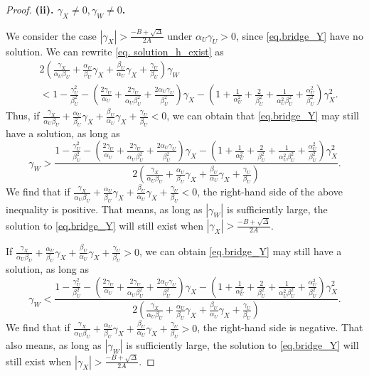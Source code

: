 \documentclass[
  12pt]{article}
\begin{document}
\begin{proof}
\textbf{(ii). $\gamma_X\ne0,\gamma_W\ne0$.} 

We consider the case $|\gamma_X|>\frac{-B+\sqrt{\Delta}}{2A}$ under $\alpha_U\gamma_U>0$, since  \eqref{eq.bridge_Y} have no solution. We can rewrite  \eqref{eq. solution_h_exist} as
\begin{align*}
    & 2\left( \frac{\gamma_X}{\alpha_U\beta_U}+\frac{\alpha_U}{\beta_U}\gamma_X+\frac{\beta_U}{\alpha_U}\gamma_X+\frac{\gamma_U}{\beta_U} \right) \gamma_W \\
    & <1-\frac{\gamma_{U}^{2}}{\beta_{U}^{2}}-\left( \frac{2\gamma_U}{\alpha_U}+\frac{2\gamma_U}{\alpha_U\beta_{U}^{2}}+\frac{2\alpha_U\gamma_U}{\beta_{U}^{2}} \right) \gamma_X-\left( 1+\frac{1}{\alpha_{U}^{2}}+\frac{2}{\beta_{U}^{2}}+\frac{1}{\alpha_{U}^{2}\beta_{U}^{2}}+\frac{\alpha_{U}^{2}}{\beta_{U}^{2}} \right) \gamma_{X}^{2}.
\end{align*}
Thus, if $\frac{\gamma_X}{\alpha_U\beta_U}+\frac{\alpha_U}{\beta_U}\gamma_X+\frac{\beta_U}{\alpha_U}\gamma_X+\frac{\gamma_U}{\beta_U}<0$, we can obtain that \eqref{eq.bridge_Y} may still have a solution, as long as
$$
\gamma_W>\frac{1-\frac{\gamma_{U}^{2}}{\beta_{U}^{2}}-\left( \frac{2\gamma_U}{\alpha_U}+\frac{2\gamma_U}{\alpha_U\beta_{U}^{2}}+\frac{2\alpha_U\gamma_U}{\beta_{U}^{2}} \right) \gamma_X-\left( 1+\frac{1}{\alpha_{U}^{2}}+\frac{2}{\beta_{U}^{2}}+\frac{1}{\alpha_{U}^{2}\beta_{U}^{2}}+\frac{\alpha_{U}^{2}}{\beta_{U}^{2}} \right) \gamma_{X}^{2}}{2\left( \frac{\gamma_X}{\alpha_U\beta_U}+\frac{\alpha_U}{\beta_U}\gamma_X+\frac{\beta_U}{\alpha_U}\gamma_X+\frac{\gamma_U}{\beta_U} \right)}.
$$
We find that if $\frac{\gamma_X}{\alpha_U\beta_U}+\frac{\alpha_U}{\beta_U}\gamma_X+\frac{\beta_U}{\alpha_U}\gamma_X+\frac{\gamma_U}{\beta_U}<0$, the right-hand side of the above inequality is positive. That means, as long as $|\gamma_W|$ is sufficiently large, the solution to  \eqref{eq.bridge_Y} will still exist when $|\gamma_X|>\frac{-B+\sqrt{\Delta}}{2A}$.


If $\frac{\gamma_X}{\alpha_U\beta_U}+\frac{\alpha_U}{\beta_U}\gamma_X+\frac{\beta_U}{\alpha_U}\gamma_X+\frac{\gamma_U}{\beta_U}>0$, we can obtain \eqref{eq.bridge_Y} may still have a solution, as long as
$$
\gamma_W<\frac{1-\frac{\gamma_{U}^{2}}{\beta_{U}^{2}}-\left( \frac{2\gamma_U}{\alpha_U}+\frac{2\gamma_U}{\alpha_U\beta_{U}^{2}}+\frac{2\alpha_U\gamma_U}{\beta_{U}^{2}} \right) \gamma_X-\left( 1+\frac{1}{\alpha_{U}^{2}}+\frac{2}{\beta_{U}^{2}}+\frac{1}{\alpha_{U}^{2}\beta_{U}^{2}}+\frac{\alpha_{U}^{2}}{\beta_{U}^{2}} \right) \gamma_{X}^{2}}{2\left( \frac{\gamma_X}{\alpha_U\beta_U}+\frac{\alpha_U}{\beta_U}\gamma_X+\frac{\beta_U}{\alpha_U}\gamma_X+\frac{\gamma_U}{\beta_U} \right)}.
$$
We find that if $\frac{\gamma_X}{\alpha_U\beta_U}+\frac{\alpha_U}{\beta_U}\gamma_X+\frac{\beta_U}{\alpha_U}\gamma_X+\frac{\gamma_U}{\beta_U}>0$, the right-hand side is negative. That also means,  as long as $|\gamma_W|$ is sufficiently large, the solution to \eqref{eq.bridge_Y} will still exist when $|\gamma_X|>\frac{-B+\sqrt{\Delta}}{2A}$.


\end{proof}
\end{document}
